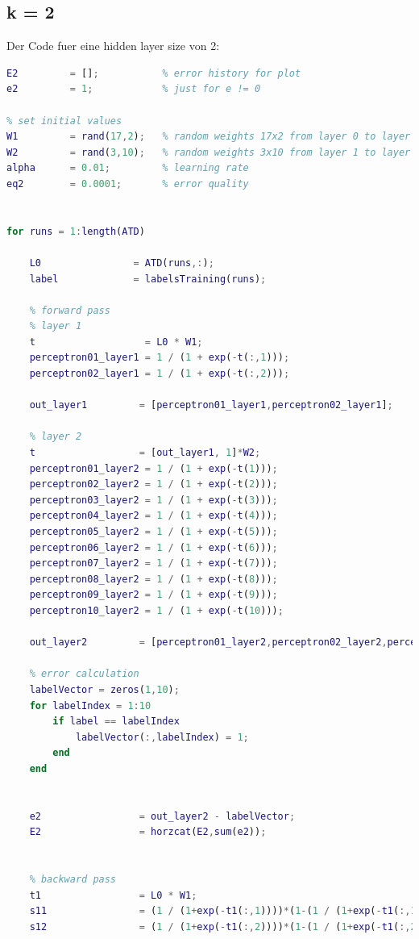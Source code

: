\documentclass[12pt]{article}
\begin{document}
\subsection{k = 2}
Der Code fuer eine hidden layer size von 2:\\
\begin{lstlisting}[language=Matlab]
% k = 2, Training
E2         = [];           % error history for plot
e2         = 1;            % just for e != 0

% set initial values
W1         = rand(17,2);   % random weights 17x2 from layer 0 to layer 1
W2         = rand(3,10);   % random weights 3x10 from layer 1 to layer 2
alpha      = 0.01;         % learning rate
eq2        = 0.0001;       % error quality


for runs = 1:length(ATD)
    
    L0                = ATD(runs,:);
    label             = labelsTraining(runs);
        
    % forward pass
    % layer 1
    t                   = L0 * W1;
    perceptron01_layer1 = 1 / (1 + exp(-t(:,1)));
    perceptron02_layer1 = 1 / (1 + exp(-t(:,2)));
    
    out_layer1         = [perceptron01_layer1,perceptron02_layer1];
    
    % layer 2
    t                  = [out_layer1, 1]*W2;
    perceptron01_layer2 = 1 / (1 + exp(-t(1)));
    perceptron02_layer2 = 1 / (1 + exp(-t(2)));
    perceptron03_layer2 = 1 / (1 + exp(-t(3)));
    perceptron04_layer2 = 1 / (1 + exp(-t(4)));
    perceptron05_layer2 = 1 / (1 + exp(-t(5)));
    perceptron06_layer2 = 1 / (1 + exp(-t(6)));
    perceptron07_layer2 = 1 / (1 + exp(-t(7)));
    perceptron08_layer2 = 1 / (1 + exp(-t(8)));
    perceptron09_layer2 = 1 / (1 + exp(-t(9)));
    perceptron10_layer2 = 1 / (1 + exp(-t(10)));
    
    out_layer2         = [perceptron01_layer2,perceptron02_layer2,perceptron03_layer2,perceptron04_layer2,perceptron05_layer2,perceptron06_layer2,perceptron07_layer2,perceptron08_layer2,perceptron09_layer2,perceptron10_layer2];
    
    % error calculation
    labelVector = zeros(1,10);
    for labelIndex = 1:10
        if label == labelIndex
            labelVector(:,labelIndex) = 1;
        end
    end


    e2                 = out_layer2 - labelVector;
    E2                 = horzcat(E2,sum(e2));
    
    
    % backward pass
    t1                 = L0 * W1;
    s11                = (1 / (1+exp(-t1(:,1))))*(1-(1 / (1+exp(-t1(:,1)))));
    s12                = (1 / (1+exp(-t1(:,2))))*(1-(1 / (1+exp(-t1(:,2)))));
       

\end{lstlisting}
\end{document}
